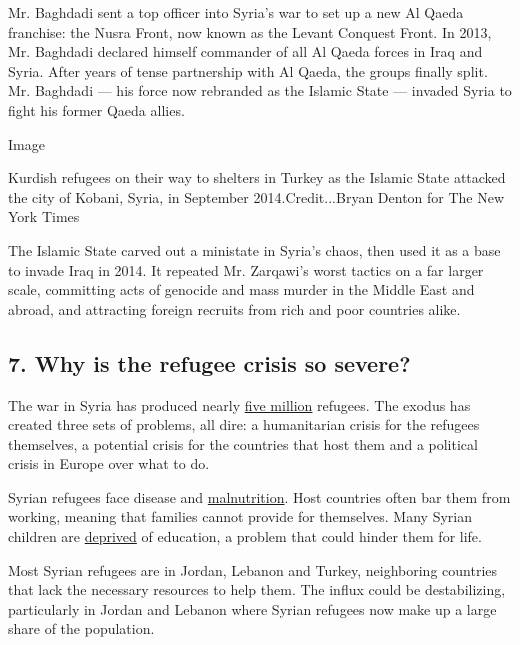 Mr. Baghdadi sent a top officer into Syria's war to set up a new Al
Qaeda franchise: the Nusra Front, now known as the Levant Conquest
Front. In 2013, Mr. Baghdadi declared himself commander of all Al Qaeda
forces in Iraq and Syria. After years of tense partnership with Al
Qaeda, the groups finally split. Mr. Baghdadi --- his force now
rebranded as the Islamic State --- invaded Syria to fight his former
Qaeda allies.

Image

Kurdish refugees on their way to shelters in Turkey as the Islamic State
attacked the city of Kobani, Syria, in September 2014.Credit...Bryan
Denton for The New York Times

The Islamic State carved out a ministate in Syria's chaos, then used it
as a base to invade Iraq in 2014. It repeated Mr. Zarqawi's worst
tactics on a far larger scale, committing acts of genocide and mass
murder in the Middle East and abroad, and attracting foreign recruits
from rich and poor countries alike.

\hypertarget{7-why-is-the-refugee-crisis-so-severe}{%
\subsection{\texorpdfstring{\textbf{7. Why is the refugee crisis so
severe?}}{7. Why is the refugee crisis so severe?}}\label{7-why-is-the-refugee-crisis-so-severe}}

The war in Syria has produced nearly
\href{http://data.unhcr.org/syrianrefugees/regional.php}{five million}
refugees. The exodus has created three sets of problems, all dire: a
humanitarian crisis for the refugees themselves, a potential crisis for
the countries that host them and a political crisis in Europe over what
to do.

Syrian refugees face disease and
\href{http://www.unicef.org/emergencies/lebanon_72711.html}{malnutrition}.
Host countries often bar them from working, meaning that families cannot
provide for themselves. Many Syrian children are
\href{http://www.nytimes3xbfgragh.onion/2016/09/15/world/middleeast/refugee-children-school-united-nations.html}{deprived}
of education, a problem that could hinder them for life.

Most Syrian refugees are in Jordan, Lebanon and Turkey, neighboring
countries that lack the necessary resources to help them. The influx
could be destabilizing, particularly in Jordan and Lebanon where Syrian
refugees now make up a large share of the population.

